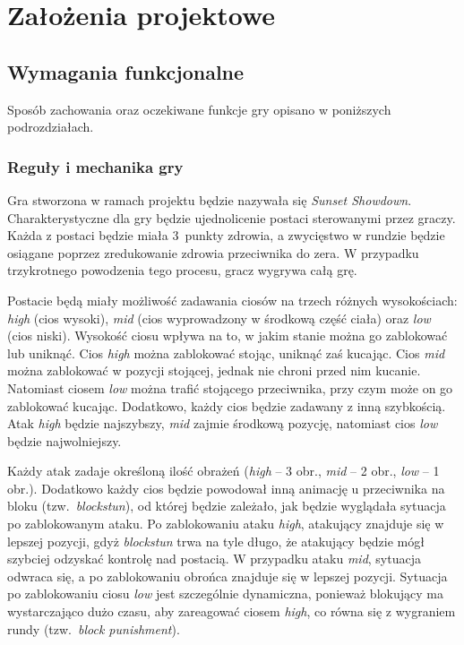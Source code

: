 \chapter{Założenia projektowe}
\section{Wymagania funkcjonalne}
Sposób zachowania oraz oczekiwane funkcje gry opisano w poniższych podrozdziałach.
\subsection{Reguły i mechanika gry}
Gra stworzona w ramach projektu będzie nazywała się \emph{Sunset Showdown}. Charakterystyczne dla gry będzie ujednolicenie postaci sterowanymi przez graczy. Każda z postaci będzie miała 3~punkty zdrowia, a zwycięstwo w rundzie będzie osiągane poprzez zredukowanie zdrowia przeciwnika do zera. W przypadku trzykrotnego powodzenia tego procesu, gracz wygrywa całą grę. 

Postacie będą miały możliwość zadawania ciosów na trzech różnych wysokościach: \emph{high} (cios wysoki), \emph{mid} (cios wyprowadzony w środkową część ciała) oraz \emph{low} (cios niski). Wysokość ciosu wpływa na to, w jakim stanie można go zablokować lub uniknąć. Cios \emph{high} można zablokować stojąc, uniknąć zaś kucając. Cios \emph{mid} można zablokować w pozycji stojącej, jednak nie chroni przed nim kucanie. Natomiast ciosem \emph{low} można trafić stojącego przeciwnika, przy czym może on go zablokować kucając. Dodatkowo, każdy cios będzie zadawany z inną szybkością. Atak \emph{high} będzie najszybszy, \emph{mid} zajmie środkową pozycję, natomiast cios \emph{low} będzie najwolniejszy. 

Każdy atak zadaje określoną ilość obrażeń (\emph{high} -- 3 obr., \emph{mid} -- 2 obr., \emph{low} -- 1 obr.). Dodatkowo każdy cios będzie powodował inną animację u przeciwnika na bloku (tzw.~\emph{blockstun}), od której będzie zależało, jak będzie wyglądała sytuacja po zablokowanym ataku. Po zablokowaniu ataku \emph{high}, atakujący znajduje się w lepszej pozycji, gdyż \emph{blockstun} trwa na tyle długo, że atakujący będzie mógł szybciej odzyskać kontrolę nad postacią. W przypadku ataku \emph{mid}, sytuacja odwraca się, a po zablokowaniu obrońca znajduje się w lepszej pozycji. Sytuacja po zablokowaniu ciosu \emph{low} jest szczególnie dynamiczna, ponieważ blokujący ma wystarczająco dużo czasu, aby zareagować ciosem \emph{high}, co równa się z wygraniem rundy (tzw.~\emph{block punishment}).

